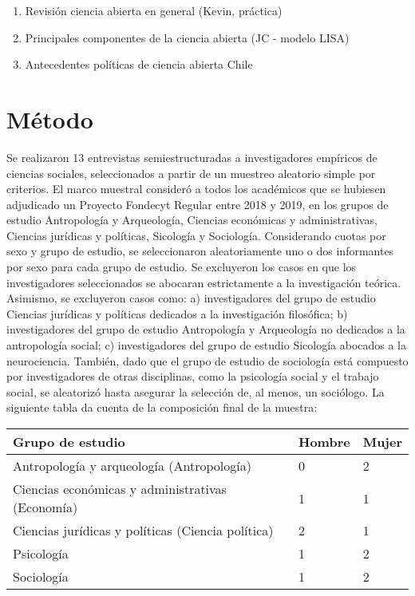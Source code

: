 \documentclass[
  letterpaper,
  DIV=11,
  numbers=noendperiod]{scrreprt}
\begin{document}
\begin{enumerate}
\def\labelenumi{\alph{enumi})}
\item
  Revisión ciencia abierta en general (Kevin, práctica)
\item
  Principales componentes de la ciencia abierta (JC - modelo LISA)
\item
  Antecedentes políticas de ciencia abierta Chile
\end{enumerate}


\chapter{Método}\label{muxe9todo}

Se realizaron 13 entrevistas semiestructuradas a investigadores
empíricos de ciencias sociales, seleccionados a partir de un muestreo
aleatorio simple por criterios. El marco muestral consideró a todos los
académicos que se hubiesen adjudicado un Proyecto Fondecyt Regular entre
2018 y 2019, en los grupos de estudio Antropología y Arqueología,
Ciencias económicas y administrativas, Ciencias jurídicas y políticas,
Sicología y Sociología. Considerando cuotas por sexo y grupo de estudio,
se seleccionaron aleatoriamente uno o dos informantes por sexo para cada
grupo de estudio. Se excluyeron los casos en que los investigadores
seleccionados se abocaran estrictamente a la investigación teórica.
Asimismo, se excluyeron casos como: a) investigadores del grupo de
estudio Ciencias jurídicas y políticas dedicados a la investigación
filosófica; b) investigadores del grupo de estudio Antropología y
Arqueología no dedicados a la antropología social; c) investigadores del
grupo de estudio Sicología abocados a la neurociencia. También, dado que
el grupo de estudio de sociología está compuesto por investigadores de
otras disciplinas, como la psicología social y el trabajo social, se
aleatorizó hasta asegurar la selección de, al menos, un sociólogo. La
siguiente tabla da cuenta de la composición final de la muestra:

\begin{longtable}[]{@{}lll@{}}
\toprule\noalign{}
Grupo de estudio & Hombre & Mujer \\
\midrule\noalign{}
\endhead
\bottomrule\noalign{}
\endlastfoot
Antropología y arqueología (Antropología) & 0 & 2 \\
Ciencias económicas y administrativas (Economía) & 1 & 1 \\
Ciencias jurídicas y políticas (Ciencia política) & 2 & 1 \\
Psicología & 1 & 2 \\
Sociología & 1 & 2 \\
\end{longtable}
\end{document}
